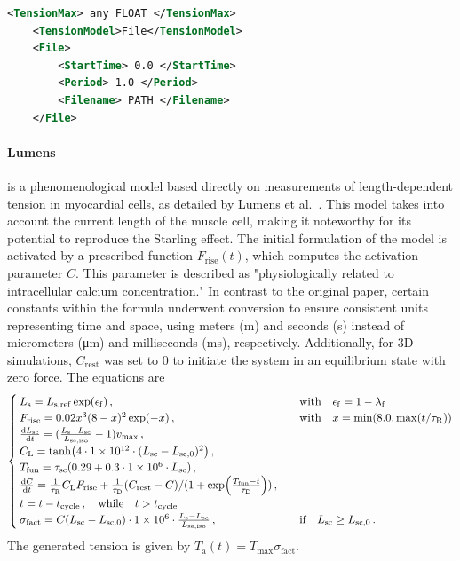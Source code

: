 \begin{lstlisting}[language=XML,caption=.xml settings for the File tension model]
    <TensionMax> any FLOAT </TensionMax>
    <TensionModel>File</TensionModel>
    <File>
        <StartTime> 0.0 </StartTime>
        <Period> 1.0 </Period>
        <Filename> PATH </Filename>
    </File>
\end{lstlisting}

\paragraph{Lumens} is a phenomenological model based directly on measurements of length-dependent tension in myocardial cells, as detailed by Lumens et al.~\cite{lumens2009}. 
This model takes into account the current length of the muscle cell, making it noteworthy for its potential to reproduce the Starling effect. 
The initial formulation of the model is activated by a prescribed function $F_\mathrm{rise}(t)$, which computes the activation parameter $C$. 
This parameter is described as "physiologically related to intracellular calcium concentration."
In contrast to the original paper, certain constants within the formula underwent conversion to ensure consistent units representing time and space, using meters (\si{m}) and seconds (\si{s}) instead of micrometers (\si{\micro m}) and milliseconds (\si{ms}), respectively.
Additionally, for 3D simulations, $C_\mathrm{rest}$ was set to 0 to initiate the system in an equilibrium state with zero force.
The equations are
\begin{equation}
    \begin{cases}
        L_\mathrm{s} = L_\mathrm{s,ref} \exp(\epsilon_\mathrm{f}) \,, & \qq{with} \epsilon_\mathrm{f} = 1 - \lambda_\mathrm{f} \\
        F_\mathrm{rise} = 0.02 x^3 (8 - x)^2 \exp(-x) \,, & \qq{with} x = \min(8.0, \max(t/\tau_\mathrm{R})) \\
        \dv{L_\mathrm{sc}}{t} = (\frac{L_\mathrm{s} - L_\mathrm{sc}}{L_\mathrm{se,iso}} - 1) v_\mathrm{max} \,, \\
        C_\mathrm{L} = \tanh(4 \cdot \num{1e12} \cdot (L_\mathrm{sc} - L_\mathrm{sc,0})^2) \,, \\
        T_\mathrm{fun} = \tau_\mathrm{sc}(0.29 + 0.3 \cdot \num{1e6}\cdot L_\mathrm{sc}) \,, \\
        \dv{C}{t} = \frac{1}{\tau_\mathrm{R}} C_\mathrm{L} F_\mathrm{rise} + \frac{1}{\tau_\mathrm{D}} (C_\mathrm{rest} - C)/ (1 + \exp(\frac{T_\mathrm{fun} - t}{\tau_\mathrm{D}})) \,, \\
        t = t - t_\mathrm{cycle} \,, \qq{while} t > t_\mathrm{cycle} \\
        \sigma_\mathrm{fact} = C (L_\mathrm{sc} - L_\mathrm{sc,0}) \cdot \num{1e6} \cdot \frac{L_\mathrm{s} - L_\mathrm{sc}}{L_\mathrm{se,iso}} \,, & \qif L_\mathrm{sc} \geq L_\mathrm{sc,0} \,.
    \end{cases}
\end{equation}
The generated tension is given by $T_\text{a}(t) = T_\text{max} \sigma_\mathrm{fact}$.

